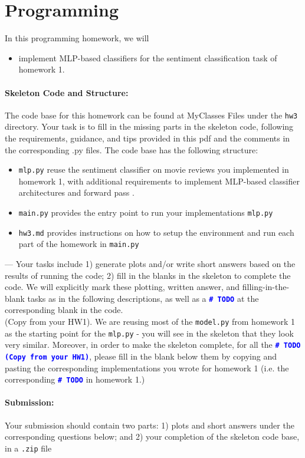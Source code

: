 \clearpage

\section{Programming}
In this programming homework, we will
\begin{itemize}
    \item implement MLP-based classifiers for the sentiment classification task of homework 1.
\end{itemize}
\noindent \paragraph{Skeleton Code and Structure:}
The code base for this homework can be found at MyClasses Files under the \texttt{hw3} directory. Your task is to fill in the missing parts in the skeleton code, following the requirements, guidance, and tips provided in this pdf and the comments in the corresponding .py files.
The code base has the following structure:
\begin{itemize}
    \item \texttt{mlp.py} reuse the sentiment classifier on movie reviews you implemented in homework 1, with additional requirements to implement MLP-based classifier architectures and forward pass .
    \item \texttt{main.py} provides the entry point to run your implementations \texttt{mlp.py}
    \item \texttt{hw3.md} provides instructions on how to setup the environment and run each part of the homework in \texttt{main.py}
\end{itemize}
\noindent \todo{} ---
Your tasks include
1) generate plots and/or write short answers based on the results of running the code; 2) fill in the blanks in the skeleton to complete the code. We will explicitly mark these plotting, written answer, and filling-in-the-blank tasks as \todo{} in the following descriptions, as well as a \textcolor{blue}{\texttt{\textbf{\#~TODO}}} at the corresponding blank in the code. \\
\noindent \todo{} (Copy from your HW1). We are reusing most of the \texttt{model.py} from homework 1 as the starting point for the \texttt{mlp.py} - you will see in the skeleton that they look very similar. Moreover, in order to make the skeleton complete, for all the \textcolor{blue}{\texttt{\textbf{\#~TODO (Copy from your HW1)}}}, please fill in the blank below them by copying and pasting the corresponding implementations you wrote for homework 1 (i.e. the corresponding \textcolor{blue}{\texttt{\textbf{\#~TODO}}} in homework 1.)
\noindent \paragraph{Submission:} Your submission should contain two parts: 1) plots and short answers under the corresponding questions below; and 2) your completion of the skeleton code base, in a \texttt{.zip} file
